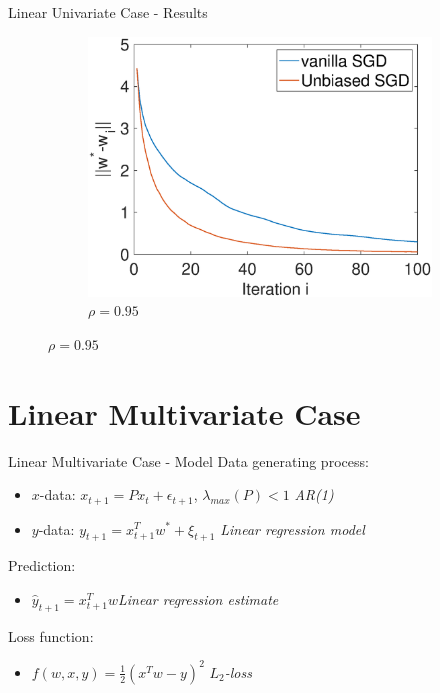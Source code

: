 \documentclass{beamer}
\begin{document}
\begin{frame}{Linear Univariate Case - Results}
\begin{figure}[h]
    \hfill
    \begin{subfigure}{0.45\textwidth}
        \centering
        \includegraphics[width=\textwidth]{AR1_rho095.eps}
        \caption{$\rho=0.95$}
        \label{fig:image2}
    \end{subfigure}
    \label{fig:side_by_side}
\end{figure}
\end{frame}


\section{Linear Multivariate Case}
\begin{frame}{Linear Multivariate Case - Model}
Data generating process:
\begin{itemize}
    \item $x$-data: $x_{t+1} = P x_t + \epsilon_{t+1}$, \;\;$\lambda_{max}(P)<1$ {\hfill \textit{AR(1)}}
    \item $y$-data: $y_{t+1}=x_{t+1}^Tw^* + \xi_{t+1}$ {\hfill \textit{Linear regression model}}
\end{itemize}
Prediction:
\begin{itemize}
    \item $\hat{y}_{t+1} = x_{t+1}^Tw${\hfill \textit{Linear regression estimate}}
\end{itemize}
Loss function:
\begin{itemize}
    \item $f(w,x,y)=\frac{1}{2}(x^Tw-y)^2$ \hfill\textit{$L_2$-loss}
\end{itemize}
    
\end{frame}
\end{document}
